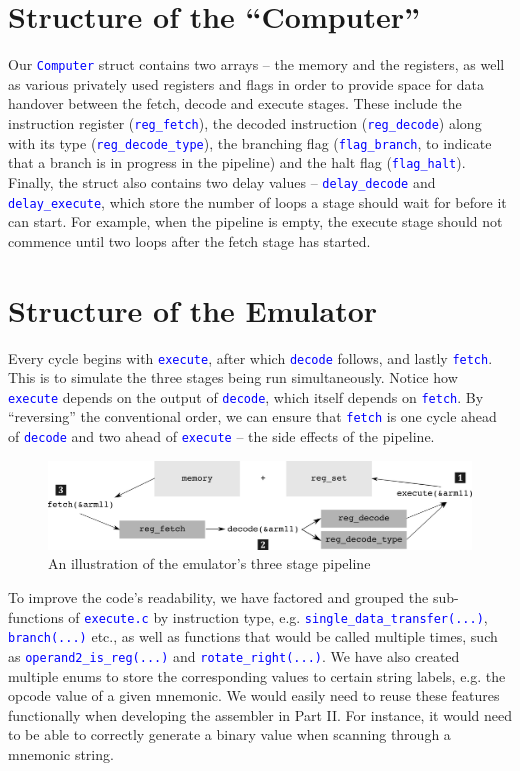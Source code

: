 \documentclass[11pt]{article}
\newcommand{\code}[1]{\mbox{\texttt{\textcolor{blue}{#1}}}}
\begin{document}
\section{Structure of the ``Computer''}

Our \code{Computer} struct contains two arrays – the memory and the registers, as well as various privately used registers and flags in order to provide space for data handover between the fetch, decode and execute stages. These include the instruction register (\code{reg\_fetch}), the decoded instruction (\code{reg\_decode}) along with its type (\code{reg\_decode\_type}), the branching flag (\code{flag\_branch}, to indicate that a branch is in progress in the pipeline) and the halt flag (\code{flag\_halt}). Finally, the struct also contains two delay values – \code{delay\_decode} and \code{delay\_execute}, which store the number of loops a stage should wait for before it can start. For example, when the pipeline is empty, the execute stage should not commence until two loops after the fetch stage has started.

\section{Structure of the Emulator}

Every cycle begins with \code{execute}, after which \code{decode} follows, and lastly \code{fetch}. This is to simulate the three stages being run simultaneously. Notice how \code{execute} depends on the output of \code{decode}, which itself depends on \code{fetch}. By ``reversing'' the conventional order, we can ensure that \code{fetch} is one cycle ahead of \code{decode} and two ahead of \code{execute} – the side effects of the pipeline.\\

\begin{figure}[h]
\centering
\includegraphics[width=\linewidth]{emulator_flow}
\caption{An illustration of the emulator's three stage pipeline}
\label{fig:emulator_flow}
\end{figure}

To improve the code's readability, we have factored and grouped the sub-functions of \code{execute.c} by instruction type, e.g. \code{single\_data\_transfer(...)}, \code{branch(...)} etc., as well as functions that would be called multiple times, such as \code{operand2\_is\_reg(...)} and \code{rotate\_right(...)}. We have also created multiple enums to store the corresponding values to certain string labels, e.g. the opcode value of a given mnemonic. We would easily need to reuse these features functionally when developing the assembler in Part II. For instance, it would need to be able to correctly generate a binary value when scanning through a mnemonic string.
\end{document}
